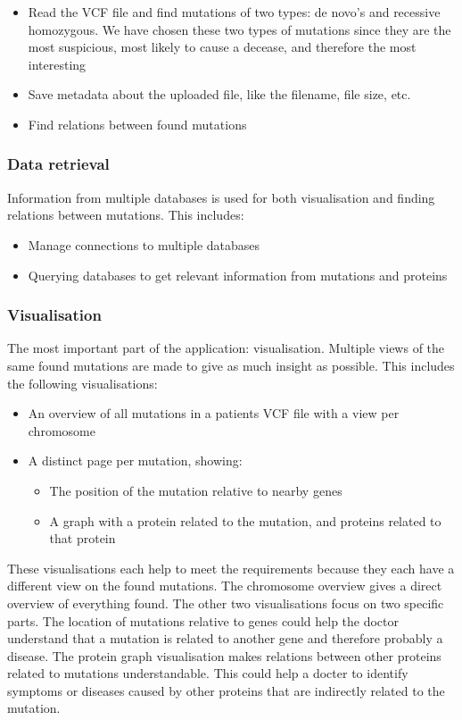 \begin{itemize}
  \item Read the VCF file and find mutations of two types: de novo's and recessive homozygous. We have chosen these two types of mutations since they are the most suspicious, most likely to cause a decease, and therefore the most interesting
  \item Save metadata about the uploaded file, like the filename, file size, etc.
  \item Find relations between found mutations
\end{itemize}

\subsubsection{Data retrieval}

Information from multiple databases is used for both visualisation and finding relations between mutations. This includes:

\begin{itemize}
  \item Manage connections to multiple databases
  \item Querying databases to get relevant information from mutations and proteins
\end{itemize}

\subsubsection{Visualisation}

The most important part of the application: visualisation. Multiple views of the same found mutations are made to give as much insight as possible. This includes the following visualisations:

\begin{itemize}
  \item An overview of all mutations in a patients VCF file with a view per chromosome
  \item A distinct page per mutation, showing:
  \begin{itemize}
     \item The position of the mutation relative to nearby genes
     \item A graph with a protein related to the mutation, and proteins related to that protein
  \end{itemize}
\end{itemize}

These visualisations each help to meet the requirements because they each have a different view on the found mutations. The chromosome overview gives a direct overview of everything found. The other two visualisations focus on two specific parts. The location of mutations relative to genes could help the doctor understand that a mutation is related to another gene and therefore probably a disease. The protein graph visualisation makes relations between other proteins related to mutations understandable. This could help a docter to identify symptoms or diseases caused by other proteins that are indirectly related to the mutation.